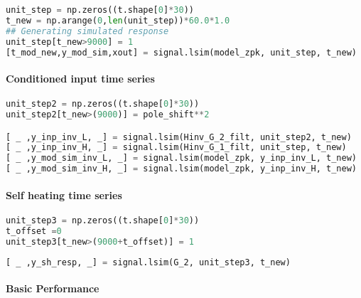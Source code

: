 \begin{spacing}{1} \begin{lstlisting}[language=Python]
unit_step = np.zeros((t.shape[0]*30))
t_new = np.arange(0,len(unit_step))*60.0*1.0
## Generating simulated response
unit_step[t_new>9000] = 1
[t_mod_new,y_mod_sim,xout] = signal.lsim(model_zpk, unit_step, t_new)
\end{lstlisting} \end{spacing}

\hypertarget{conditioned-input-time-series}{%
\paragraph{Conditioned input time
series}\label{conditioned-input-time-series}}

\begin{spacing}{1} \begin{lstlisting}[language=Python]
unit_step2 = np.zeros((t.shape[0]*30))
unit_step2[t_new>(9000)] = pole_shift**2

[ _ ,y_inp_inv_L, _] = signal.lsim(Hinv_G_2_filt, unit_step2, t_new)
[ _ ,y_inp_inv_H, _] = signal.lsim(Hinv_G_1_filt, unit_step, t_new)
[ _ ,y_mod_sim_inv_L, _] = signal.lsim(model_zpk, y_inp_inv_L, t_new)
[ _ ,y_mod_sim_inv_H, _] = signal.lsim(model_zpk, y_inp_inv_H, t_new)
\end{lstlisting} \end{spacing}

\hypertarget{self-heating-time-series}{%
\paragraph{Self heating time series}\label{self-heating-time-series}}

\begin{spacing}{1} \begin{lstlisting}[language=Python]
unit_step3 = np.zeros((t.shape[0]*30))
t_offset =0
unit_step3[t_new>(9000+t_offset)] = 1
\end{lstlisting} \end{spacing}

\begin{spacing}{1} \begin{lstlisting}[language=Python]
[ _ ,y_sh_resp, _] = signal.lsim(G_2, unit_step3, t_new)
\end{lstlisting} \end{spacing}

\hypertarget{basic-performance}{%
\paragraph{Basic Performance}\label{basic-performance}}

